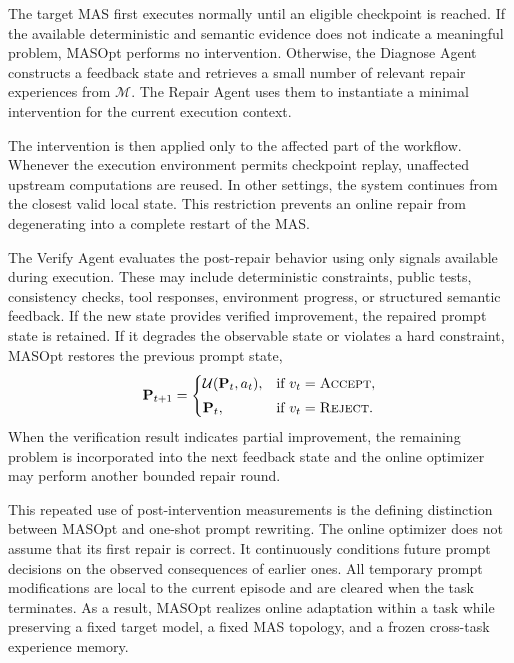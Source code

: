The target MAS first executes normally until an eligible checkpoint is reached.
If the available deterministic and semantic evidence does not indicate a meaningful problem, MASOpt performs no intervention.
Otherwise, the Diagnose Agent constructs a feedback state and retrieves a small number of relevant repair experiences from $\mathcal{M}$.
The Repair Agent uses them to instantiate a minimal intervention for the current execution context.

The intervention is then applied only to the affected part of the workflow.
Whenever the execution environment permits checkpoint replay, unaffected upstream computations are reused.
In other settings, the system continues from the closest valid local state.
This restriction prevents an online repair from degenerating into a complete restart of the MAS.

The Verify Agent evaluates the post-repair behavior using only signals available during execution.
These may include deterministic constraints, public tests, consistency checks, tool responses, environment progress, or structured semantic feedback.
If the new state provides verified improvement, the repaired prompt state is retained.
If it degrades the observable state or violates a hard constraint, MASOpt restores the previous prompt state,
\begin{equation}
    \mathbf{P}_{t+1}
    =
    \begin{cases}
        \mathcal{U}(\mathbf{P}_t,a_t),
        & \text{if } v_t=\textsc{Accept}, \\[3pt]
        \mathbf{P}_t,
        & \text{if } v_t=\textsc{Reject}.
    \end{cases}
    \label{eq:accept}
\end{equation}
When the verification result indicates partial improvement, the remaining problem is incorporated into the next feedback state and the online optimizer may perform another bounded repair round.

This repeated use of post-intervention measurements is the defining distinction between MASOpt and one-shot prompt rewriting.
The online optimizer does not assume that its first repair is correct.
It continuously conditions future prompt decisions on the observed consequences of earlier ones.
All temporary prompt modifications are local to the current episode and are cleared when the task terminates.
As a result, MASOpt realizes online adaptation within a task while preserving a fixed target model, a fixed MAS topology, and a frozen cross-task experience memory.
